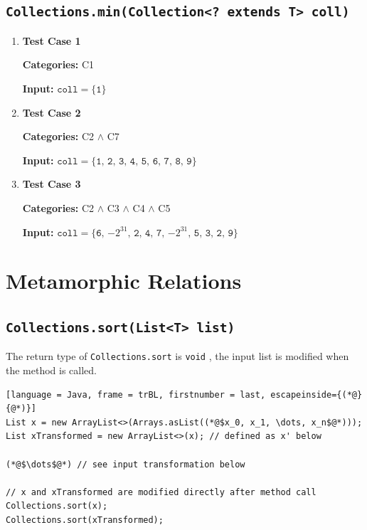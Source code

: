 \documentclass[12pt, a4paper]{article}
\begin{document}
\subsection{\texttt{Collections.min(Collection<? extends T> coll)}}
\begin{enumerate}
  \item \textbf{Test Case 1}
  \par\quad\textbf{Categories:} C1
  \par\quad\textbf{Input:} $\texttt{coll} = \{\texttt{1}\}$

  \item \textbf{Test Case 2}
  \par\quad\textbf{Categories:} C2 $\wedge$ C7
  \par\quad\textbf{Input:} $\texttt{coll} = \{\texttt{1, 2, 3, 4, 5, 6, 7, 8, 9}\}$

  \item \textbf{Test Case 3}
  \par\quad\textbf{Categories:} C2 $\wedge$ C3 $\wedge$ C4 $\wedge$ C5

  \par\quad\textbf{Input:} $\texttt{coll} = \{\texttt{6, $-2^{31}$, 2, 4, 7, $-2^{31}$, 5, 3, 2,
  9}\}$
\end{enumerate}

\section{Metamorphic Relations}
\subsection{\texttt{Collections.sort(List<T> list)}}
The return type of \texttt{Collections.sort} is \texttt{void} \cite{collection_sort}, the input list
is modified when the method is called.

\begin{lstlisting}[language = Java, frame = trBL, firstnumber = last, escapeinside={(*@}{@*)}]
List x = new ArrayList<>(Arrays.asList((*@$x_0, x_1, \dots, x_n$@*)));
List xTransformed = new ArrayList<>(x); // defined as x' below

(*@$\dots$@*) // see input transformation below

// x and xTransformed are modified directly after method call
Collections.sort(x);
Collections.sort(xTransformed);
\end{lstlisting}
\end{document}
